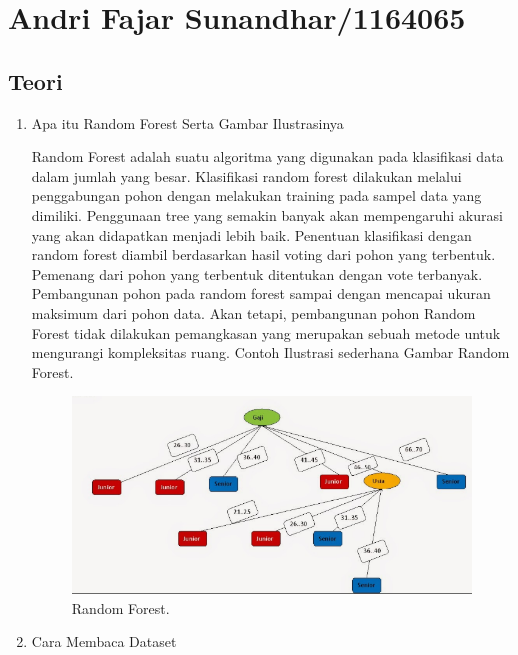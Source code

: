 \section{Andri Fajar Sunandhar/1164065}
\subsection{Teori}
\begin{enumerate}
\item Apa itu Random Forest Serta Gambar Ilustrasinya \par
Random Forest adalah suatu algoritma yang digunakan pada klasifikasi data dalam jumlah yang besar. Klasifikasi random forest dilakukan melalui penggabungan pohon  dengan melakukan training pada sampel data yang dimiliki. Penggunaan tree yang semakin banyak akan mempengaruhi akurasi yang akan didapatkan menjadi lebih baik. Penentuan klasifikasi dengan random forest diambil berdasarkan hasil voting dari pohon yang terbentuk. Pemenang dari pohon yang terbentuk ditentukan dengan vote terbanyak. Pembangunan pohon  pada random forest sampai dengan mencapai ukuran maksimum dari pohon data. Akan tetapi, pembangunan pohon Random Forest tidak dilakukan pemangkasan  yang merupakan sebuah metode untuk mengurangi kompleksitas ruang. Contoh Ilustrasi sederhana Gambar Random Forest. 
		\begin{figure}[ht]
		\centerline{\includegraphics[width=1\textwidth]{figures/AFS/AFS1.png}}
		\caption{Random Forest.}
		\label{AFS1}
		\end{figure}

\item Cara Membaca Dataset
	


\end{enumerate}
